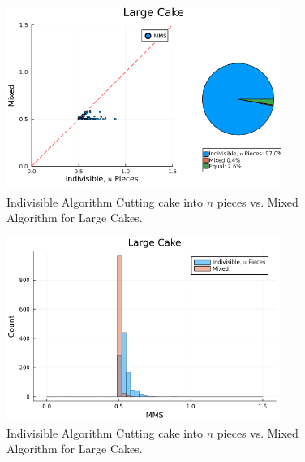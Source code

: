\begin{figure}
    \centering
    \includegraphics[width=0.8\textwidth]{assets/plots/scatter_indivisible_n_pieces_vs_mixed_large_cake.png}
    \caption{Indivisible Algorithm Cutting cake into $n$ pieces vs. Mixed Algorithm for Large Cakes.}
    \label{fig:scatter_indivisible_n_pieces_vs_mixed_large_cake}
\end{figure}
\begin{figure}
    \centering
    \includegraphics[width=0.8\textwidth]{assets/plots/histogram_indivisible_n_pieces_vs_mixed_large_cake.png}
    \caption{Indivisible Algorithm Cutting cake into $n$ pieces vs. Mixed Algorithm for Large Cakes.}
    \label{fig:histogram_indivisible_n_pieces_vs_mixed_large_cake}
\end{figure}


